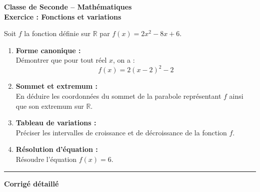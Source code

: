\documentclass[11pt,a4paper]{article}
\begin{document}
\begin{center}
    {\Large \textbf{Classe de Seconde -- Mathématiques}} \\[0.3em]
    {\large \textbf{Exercice : Fonctions et variations}}
\end{center}

\vspace{0.5cm}

Soit $f$ la fonction définie sur $\mathbb{R}$ par $f(x) = 2x^2 - 8x + 6$.

\begin{enumerate}
    \item \textbf{Forme canonique :}\\
    Démontrer que pour tout réel $x$, on a : 
    $$f(x) = 2(x - 2)^2 - 2$$

    \item \textbf{Sommet et extremum :}\\
    En déduire les coordonnées du sommet de la parabole représentant $f$ ainsi que son extremum sur $\mathbb{R}$.

    \item \textbf{Tableau de variations :}\\
    Préciser les intervalles de croissance et de décroissance de la fonction $f$.

    \item \textbf{Résolution d'équation :}\\
    Résoudre l'équation $f(x) = 6$.
\end{enumerate}

\vspace{0.5cm}
\hrule
\vspace{0.5cm}

\begin{center}
    {\large \textbf{Corrigé détaillé}}
\end{center}
\end{document}

